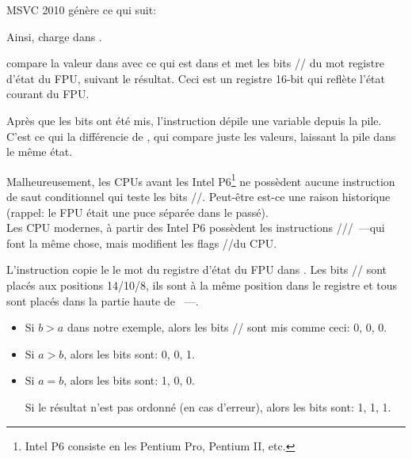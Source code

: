 
MSVC 2010 génère ce qui suit:




Ainsi, \FLD charge  dans .

\label{Czero_etc}
\newcommand{\Czero}{\GTT{C0}\xspace}
\newcommand{\Ctwo}{\GTT{C2}\xspace}
\newcommand{\Cthree}{\GTT{C3}\xspace}
\newcommand{\CThreeBits}{\Cthree/\Ctwo/\Czero}


\FCOMP compare la valeur dans  avec ce qui est dans  et met les bits
\CThreeBits du mot registre d'état du FPU, suivant le résultat.
Ceci est un registre 16-bit qui reflète l'état courant du FPU.

Après que les bits ont été mis, l'instruction \FCOMP dépile une variable depuis la
pile.
C'est ce qui la différencie de \FCOM, qui compare juste les valeurs, laissant la
pile dans le même état.

Malheureusement, les CPUs avant les Intel P6\footnote{Intel P6 consiste en les Pentium
Pro, Pentium II, etc.} ne possèdent aucune instruction de saut conditionnel qui teste
les bits \CThreeBits.
Peut-être est-ce une raison historique (rappel: le FPU était une puce séparée dans
le passé).\\Les CPU modernes, à partir des Intel P6 possèdent les instructions \FCOMI/\FCOMIP/\FUCOMI/\FUCOMIP~---qui
font la même chose, mais modifient les flags \ZF/\PF/\CF du CPU.


L'instruction \FNSTSW copie le le mot du registre d'état du FPU dans \AX.
Les bits \CThreeBits sont placés aux positions 14/10/8, ils sont à la même position
dans le registre \AX et tous sont placés dans la partie haute de \AX{}~---\AH{}.

\begin{itemize}
\item Si $b>a$ dans notre exemple, alors les bits \CThreeBits sont mis comme ceci: 0, 0, 0.
\item Si $a>b$, alors les bits sont: 0, 0, 1.
\item Si $a=b$, alors les bits sont: 1, 0, 0.

Si le résultat n'est pas ordonné (en cas d'erreur), alors les bits sont: 1, 1, 1.
\end{itemize}

